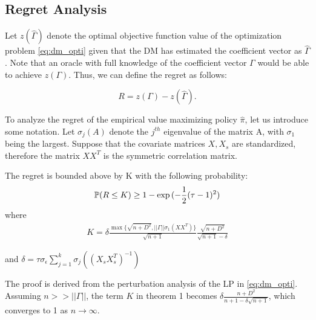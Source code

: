 \documentclass[11pt,a4paper]{article}
\begin{document}
\iffalse
or, we can write: %

$$Max_{\hat \pi, y_i}: E \left( \left(\hat \Gamma^T X Diag(A \mathbf{1}_{N} ) ^{-1} A \right) \hat \pi  - \sum_{i \leq N} y_i \right)$$ subject to: 

$$\forall i,  \left( Diag(A \mathbf{1}_{N} ) ^{-1} A \hat \pi \right)_i \leq y_i$$

$$\forall i, y_i, \hat \pi_i \in \{0,1\} $$
\fi

\subsection{Regret Analysis}
Let $z(\hat \Gamma)$ denote the optimal objective function value of the optimization problem \eqref{eq:dm_opti} given that the DM has estimated the coefficient vector as $\hat{\Gamma} $. Note that an oracle with full knowledge of the coefficient vector $\Gamma$ would be able to achieve $z(\Gamma)$. Thus, we can define the regret as follows:

$$R = z(\Gamma) - z(\hat{\Gamma}) .$$

To analyze the regret of the empirical value maximizing policy $\hat \pi$, let us introduce some notation. Let $\sigma_j( A)$ denote the $j^{th}$ eigenvalue of the matrix A, with $\sigma_1$ being the largest. Suppose that the covariate matrices $X, X_s$ are standardized, therefore the matrix $X X^T$ is the symmetric correlation matrix. 
\begin{thm}
The regret is bounded above by K with the following probability:
\begin{align}
\mathbb{P}(R \leq K) \geq 1 - \exp{(-\frac{1}{2} (\tau -1 )^2 )}
\end{align}
where
\begin{align}
K = \delta \frac{ \max \{\sqrt{n+D^2}, || \Gamma || \sigma_{1} (X X^T) \} }{ \sqrt{n+1} } \frac{ \sqrt{n+D^2} }{\sqrt{n+1} - \delta }
\end{align}

and $\delta = \tau \sigma_\epsilon \sum_{j=1}^k \sigma_j( (X_s X_s^T)^{-1})$
\end{thm}

The proof is derived from the perturbation analysis of the LP in \eqref{eq:dm_opti}. Assuming $n >> ||\Gamma||$, the term $K$ in theorem 1 becomes $\delta \frac{n+D^2}{n+1 -  \delta \sqrt{n+1}}$, which converges to 1 as $n \rightarrow \infty$.
\end{document}
